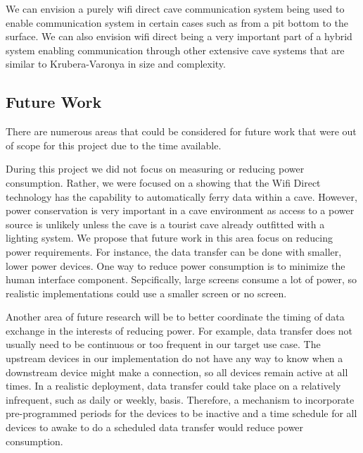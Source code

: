 \documentclass[10pt,twocolumn]{article}
\begin{document}
We can envision a purely wifi direct cave communication system being used to enable communication system in certain cases such as from a pit bottom to the surface.
We can also envision wifi direct being a very important part of a hybrid system enabling communication through other extensive cave systems that are similar to Krubera-Varonya in size and complexity. 

\subsection{Future Work}
There are numerous areas that could be considered for future work that were out of scope for this project due to the time available.

During this project we did not focus on measuring or reducing power consumption.
Rather, we were focused on a showing that the Wifi Direct technology has the capability to automatically ferry data within a cave.
However, power conservation is very important in a cave environment as access to a power source is unlikely unless the cave is a tourist cave already outfitted with a lighting system.
We propose that future work in this area focus on reducing power requirements.
For instance, the data transfer can be done with smaller, lower power devices.
One way to reduce power consumption is to minimize the human interface component.
Sepcifically, large screens consume a lot of power, so realistic implementations could use a smaller screen or no screen.

Another area of future research will be to better coordinate the timing of data exchange in the interests of reducing power.
For example, data transfer does not usually need to be continuous or too frequent in our target use case.
The upstream devices in our implementation do not have any way to know when a downstream device might make a connection, 
so all devices remain active at all times.
In a realistic deployment, data transfer could take place on a relatively infrequent, such as daily or weekly, basis.
Therefore, a mechanism to incorporate pre-programmed periods for the devices to be inactive
and a time schedule for all devices to awake to do a scheduled data transfer would reduce power consumption.



\end{document}
